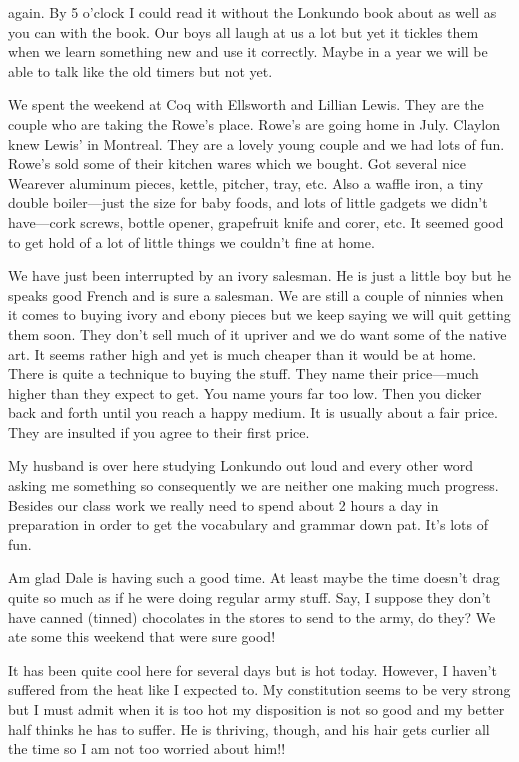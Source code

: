 \documentclass[
]{book}
\begin{document}
again. By 5 o'clock I could read it without the Lonkundo book about as well as you can with the book. Our boys all laugh at us a lot but yet it tickles them when we learn something new and use it correctly. Maybe in a year we will be able to talk like the old timers but not yet.

We spent the weekend at Coq with Ellsworth and Lillian Lewis. They are the couple who are taking the Rowe's place. Rowe's are going home in July. Claylon knew Lewis' in Montreal. They are a lovely young couple and we had lots of fun. Rowe's sold some of their kitchen wares which we bought. Got several nice Wearever aluminum pieces, kettle, pitcher, tray, etc. Also a waffle iron, a tiny double boiler---just the size for baby foods, and lots of little gadgets we didn't have---cork screws, bottle opener, grapefruit knife and corer, etc. It seemed good to get hold of a lot of little things we couldn't fine at home.

We have just been interrupted by an ivory salesman. He is just a little boy but he speaks good French and is sure a salesman. We are still a couple of ninnies when it comes to buying ivory and ebony pieces but we keep saying we will quit getting them soon. They don't sell much of it upriver and we do want some of the native art. It seems rather high and yet is much cheaper than it would be at home. There is quite a technique to buying the stuff. They name their price---much higher than they expect to get. You name yours far too low. Then you dicker back and forth until you reach a happy medium. It is usually about a fair price. They are insulted if you agree to their first price.

My husband is over here studying Lonkundo out loud and every other word asking me something so consequently we are neither one making much progress. Besides our class work we really need to spend about 2 hours a day in preparation in order to get the vocabulary and grammar down pat. It's lots of fun.

Am glad Dale is having such a good time. At least maybe the time doesn't drag quite so much as if he were doing regular army stuff. Say, I suppose they don't have canned (tinned) chocolates in the stores to send to the army, do they? We ate some this weekend that were sure good!

It has been quite cool here for several days but is hot today. However, I haven't suffered from the heat like I expected to. My constitution seems to be very strong but I must admit when it is too hot my disposition is not so good and my better half thinks he has to suffer. He is thriving, though, and his hair gets curlier all the time so I am not too worried about him!!
\end{document}
